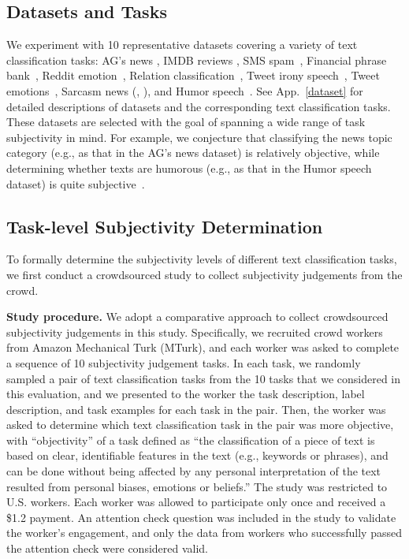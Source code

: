 \subsection{Datasets and Tasks}
We experiment  with 10 representative datasets covering a variety of text classification tasks: AG's news \citep{Zhang2015CharacterlevelCN}, IMDB reviews \citep{maas-EtAl:2011:ACL-HLT2011}, 
SMS  spam~\citep{Almeida2011SpamFiltering}, Financial phrase bank~\citep{Malo2014GoodDO},
Reddit emotion~\citep{demszky2020goemotions}, %
Relation classification~\citep{gao-etal-2019-fewrel}, Tweet irony speech~\citep{van2018semeval}, 
Tweet emotions~\citep{mohammad2018semeval}, 
Sarcasm news (\citealp{misra2023Sarcasm}, \citealp{misra2021sculpting}), and 
Humor speech~\citep{annamoradnejad2020colbert}. 
See App.~\ref{dataset} for detailed descriptions of datasets and the corresponding text classification tasks.
These datasets are selected with the goal of spanning a wide range of task subjectivity in mind. For example, we conjecture that classifying the news topic category (e.g., as that in the AG's news dataset) is relatively objective, while determining whether texts are humorous (e.g., as that in the Humor speech dataset) is quite subjective~\cite{veatch1998theory}. 

\subsection{Task-level Subjectivity Determination}
\label{subrank}

To formally determine the subjectivity levels of different text classification tasks, we first conduct a crowdsourced study to collect subjectivity judgements from the crowd.

\noindent \textbf{Study procedure.}
We adopt a comparative approach to collect crowdsourced subjectivity judgements in this study. 
Specifically, 
we recruited crowd workers from Amazon Mechanical Turk (MTurk), and each worker was asked to complete a sequence of 10 subjectivity judgement tasks. 
In each task, we randomly sampled a pair of text classification tasks from the 10 tasks that we considered in this evaluation, and we presented to the worker the task description, label description, and task examples for each task in the pair. 
Then, the worker was asked to determine which text classification task in the pair was more objective, with ``objectivity'' of a task defined as ``the classification of a piece of text is based on clear, identifiable features in the text (e.g., keywords or phrases), and can be done without being affected by any personal interpretation of the text resulted from personal biases, emotions or beliefs.''  The study was restricted to U.S. workers. Each worker was allowed to participate only once and received a \$1.2 payment. An attention check question was included in the study to validate the worker's engagement, and only the data from workers who successfully passed the attention check were considered valid.

